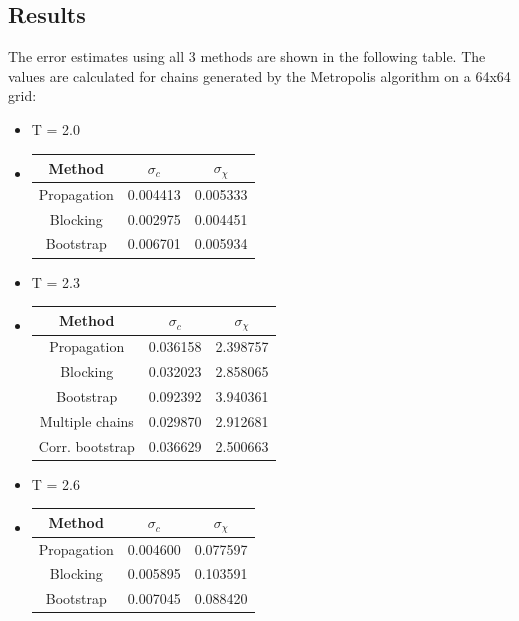 \documentclass[11pt, a4paper]{scrartcl}
\begin{document}
\subsection{Results}
    The error estimates using all 3 methods are shown in the following table. The values are calculated for chains generated by the Metropolis algorithm on a 64x64 grid:
    \begin{itemize}
        \item T = 2.0
        \item[ ]
            \begin{tabular}{|c||c|c|}
            \hline
            Method & $\sigma_c$ & $\sigma_\chi$ \\
            \hline
            \hline
            Propagation & 0.004413 & 0.005333 \\
            \hline
            Blocking & 0.002975 & 0.004451 \\
            \hline
            Bootstrap & 0.006701 & 0.005934 \\
            \hline
            \end{tabular}
        \item T = 2.3
        \item[ ]
            \begin{tabular}{|c||c|c|}
            \hline
            Method & $\sigma_c$ & $\sigma_\chi$ \\
            \hline
            \hline
            Propagation & 0.036158 & 2.398757 \\
            \hline
            Blocking & 0.032023 & 2.858065 \\
            \hline
            Bootstrap & 0.092392 & 3.940361 \\
            \hline
            Multiple chains & 0.029870 & 2.912681 \\
            \hline
            Corr. bootstrap & 0.036629 & 2.500663 \\
            \hline
            \end{tabular}
        \item T = 2.6
        \item[ ]
            \begin{tabular}{|c||c|c|}
            \hline
            Method & $\sigma_c$ & $\sigma_\chi$ \\
            \hline
            \hline
            Propagation & 0.004600 & 0.077597 \\
            \hline
            Blocking & 0.005895 & 0.103591 \\
            \hline
            Bootstrap & 0.007045 & 0.088420 \\
            \hline
            \end{tabular}
    \end{itemize}
\end{document}
